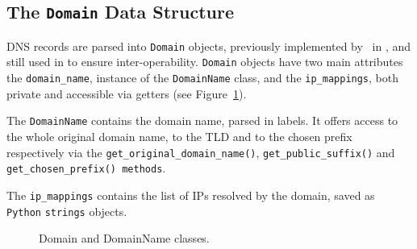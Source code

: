 
\subsection{The \texttt{Domain} Data Structure} %
\label{sub:data_structures}
DNS records are parsed into \texttt{Domain} objects, previously implemented
by~\citet{schiavoni2013} in \phoenix, and still used in \thesystem to ensure
inter-operability.
\texttt{Domain} objects have two main attributes the \texttt{domain\_name},
instance of the \texttt{DomainName} class, and the \texttt{ip\_mappings}, both
private and accessible via getters (see Figure~\ref{fig:domain_class}).

The \texttt{DomainName} contains the domain name, parsed in labels. It offers
access to the whole original domain name, to the TLD and to the chosen prefix
respectively via the \texttt{get\_original\_domain\_name()},
\texttt{get\_public\_suffix()} and \texttt{get\_chosen\_prefix() methods}.

The \texttt{ip\_mappings} contains the list of IPs resolved by the domain,
saved as \texttt{Python} \texttt{strings} objects.

\begin{figure}[!htp]
    \centering
    \caption{Domain and DomainName classes.}
    \label{fig:domain_class}
\end{figure}

